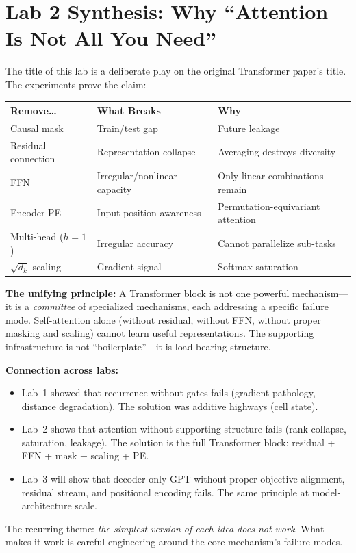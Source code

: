\section{Lab 2 Synthesis: Why ``Attention Is Not All You Need''}

The title of this lab is a deliberate play on the original Transformer paper's title. The experiments prove the claim:

\begin{center}
\begin{tabular}{lll}
\toprule
\textbf{Remove\ldots} & \textbf{What Breaks} & \textbf{Why} \\
\midrule
Causal mask & Train/test gap & Future leakage \\
Residual connection & Representation collapse & Averaging destroys diversity \\
FFN & Irregular/nonlinear capacity & Only linear combinations remain \\
Encoder PE & Input position awareness & Permutation-equivariant attention \\
Multi-head ($h=1$) & Irregular accuracy & Cannot parallelize sub-tasks \\
$\sqrt{d_k}$ scaling & Gradient signal & Softmax saturation \\
\bottomrule
\end{tabular}
\end{center}

\textbf{The unifying principle:} A Transformer block is not one powerful mechanism---it is a \emph{committee} of specialized mechanisms, each addressing a specific failure mode. Self-attention alone (without residual, without FFN, without proper masking and scaling) cannot learn useful representations. The supporting infrastructure is not ``boilerplate''---it is load-bearing structure.

\textbf{Connection across labs:}
\begin{itemize}
\item Lab~1 showed that recurrence without gates fails (gradient pathology, distance degradation). The solution was additive highways (cell state).
\item Lab~2 shows that attention without supporting structure fails (rank collapse, saturation, leakage). The solution is the full Transformer block: residual + FFN + mask + scaling + PE.
\item Lab~3 will show that decoder-only GPT without proper objective alignment, residual stream, and positional encoding fails. The same principle at model-architecture scale.
\end{itemize}

The recurring theme: \emph{the simplest version of each idea does not work}. What makes it work is careful engineering around the core mechanism's failure modes.
